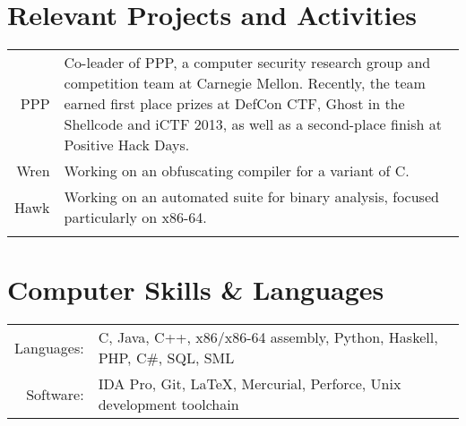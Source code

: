 \documentclass{article}
\begin{document}
\section{Relevant Projects and Activities}

\begin{tabular}{r|p{}}
PPP & \footnotesize{Co-leader of PPP, a computer security research group and competition team at
Carnegie Mellon. Recently, the team earned first place prizes at DefCon CTF, Ghost in the Shellcode and iCTF
2013, as well as a second-place finish at Positive Hack Days.} \\
Wren & \footnotesize{Working on an obfuscating compiler for a variant of C.} \\
Hawk & \footnotesize{Working on an automated suite for binary analysis, focused particularly on
x86-64.} \\
\multicolumn{2}{c}{}\\
\end{tabular}

\section{Computer Skills \& Languages}
\begin{tabular}{rl}
Languages: & C, Java, C++, x86/x86-64 assembly, Python, Haskell, PHP, C\#, SQL, SML \\
Software: & IDA Pro, Git, \LaTeX, Mercurial, Perforce, Unix development toolchain \\
\end{tabular}
\end{document}
